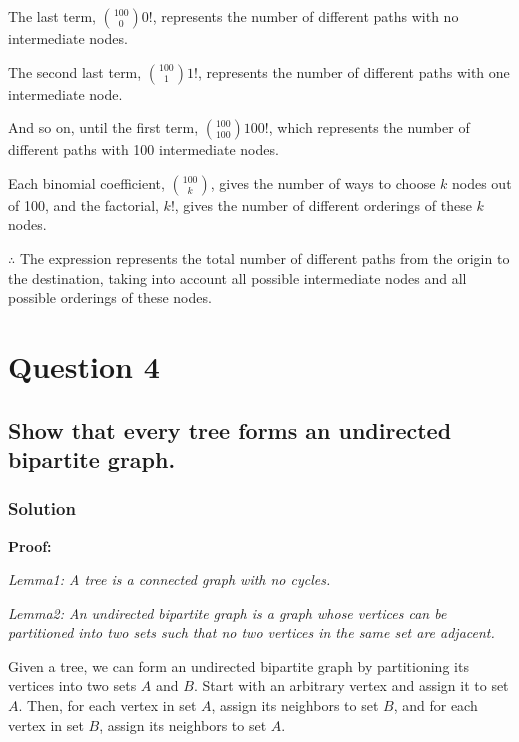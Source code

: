 \documentclass[11pt]{article}
\begin{document}
The last term, \(\binom{100}{0}0!\), represents the number of different
paths with no intermediate nodes.

The second last term, \(\binom{100}{1}1!\), represents the number of
different paths with one intermediate node.

And so on, until the first term, \(\binom{100}{100}100!\), which
represents the number of different paths with 100 intermediate nodes.

Each binomial coefficient, \(\binom{100}{k}\), gives the number of ways
to choose \(k\) nodes out of 100, and the factorial, \(k!\), gives the
number of different orderings of these \(k\) nodes.

\(\therefore\) The expression represents the total number of different
paths from the origin to the destination, taking into account all
possible intermediate nodes and all possible orderings of these nodes.

    \hypertarget{question-4}{%
\section{Question 4}\label{question-4}}

\hypertarget{show-that-every-tree-forms-an-undirected-bipartite-graph.}{%
\subsection{Show that every tree forms an undirected bipartite
graph.}\label{show-that-every-tree-forms-an-undirected-bipartite-graph.}}

\hypertarget{solution}{%
\subsubsection{Solution}\label{solution}}

\textbf{Proof:}

\emph{Lemma1: A tree is a connected graph with no cycles.}

\emph{Lemma2: An undirected bipartite graph is a graph whose vertices
can be partitioned into two sets such that no two vertices in the same
set are adjacent.}

Given a tree, we can form an undirected bipartite graph by partitioning
its vertices into two sets \(A\) and \(B\). Start with an arbitrary
vertex and assign it to set \(A\). Then, for each vertex in set \(A\),
assign its neighbors to set \(B\), and for each vertex in set \(B\),
assign its neighbors to set \(A\).
\end{document}
